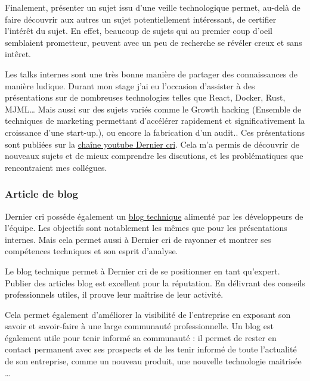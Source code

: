 \bigskip

Finalement, présenter un sujet issu d'une veille technologique permet,
au-delà de faire découvrir aux autres un sujet potentiellement
intéressant, de certifier l'intérêt du sujet. En effet, beaucoup de
sujets qui au premier coup d'oeil semblaient prometteur, peuvent avec un
peu de recherche se révéler creux et sans intêret.

\bigskip

Les talks internes sont une très bonne manière de partager des
connaissances de manière ludique. Durant mon stage j'ai eu l'occasion
d'assister à des présentations sur de nombreuses technologies telles que
React, Docker, Rust, MJML\ldots{} Mais aussi sur des sujets variés comme
le Growth hacking (Ensemble de techniques de marketing permettant
d'accélérer rapidement et significativement la croissance d'une
start-up.), ou encore la fabrication d'un audit.. Ces présentations sont
publiées sur la
\href{https://www.youtube.com/channel/UCDfdBlzldhg_PEu3xZTPsHg}{chaîne
youtube Dernier cri}. Cela m'a permis de découvrir de nouveaux sujets et
de mieux comprendre les discutions, et les problématiques que
rencontraient mes collégues.

\bigskip

\subsubsection{Article de blog}\label{article-de-blog}

\bigskip

Dernier cri posséde également un
\href{http://derniercri.io/tech-blog}{blog technique} alimenté par les
développeurs de l'équipe. Les objectifs sont notablement les mêmes que
pour les présentations internes. Mais cela permet aussi à Dernier cri de
rayonner et montrer ses compétences techniques et son esprit d'analyse.

\bigskip

Le blog technique permet à Dernier cri de se positionner en tant
qu'expert. Publier des articles blog est excellent pour la réputation.
En délivrant des conseils professionnels utiles, il prouve leur maîtrise
de leur activité.

\bigskip

Cela permet également d'améliorer la visibilité de l'entreprise en
exposant son savoir et savoir-faire à une large communauté
professionnelle. Un blog est également utile pour tenir informé sa
communauté : il permet de rester en contact permanent avec ses prospects
et de les tenir informé de toute l'actualité de son entreprise, comme un
nouveau produit, une nouvelle technologie maitrisée \ldots{}

